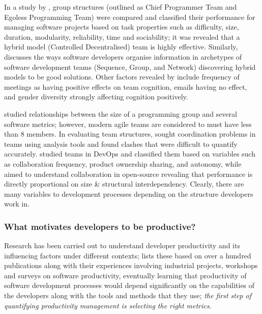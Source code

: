 \documentclass[../mpaper.tex]{subfiles}
\begin{document}
In a study by \citet{manteiEffectProgrammingTeam1981}, group structures (outlined as Chief Programmer Team and Egoless Programming Team) were compared and classified their performance for managing software projects based on task properties such as difficulty, size, duration, modularity, reliability, time and sociability; it was revealed that a hybrid model (Controlled Decentralised) team is highly effective. Similarly, \citet{sawyerSoftwareDevelopmentTeams2004} discusses the ways software developers organise information in archetypes of software development teams (Sequence, Group, and Network) discovering hybrid models to be good solutions. Other factors revealed by \citet{heTeamCognitionDevelopment2007} include frequency of meetings as having positive effects on team cognition, emails having no effect, and gender diversity strongly affecting cognition positively.

\citet{basili1979investigation} studied relationships between the size of a programming group and several software metrics; however, modern agile teams are considered to must have less than 8 members. In evaluating team structures, \citet{amritIdentifyingCoordinationProblems2012} sought coordination problems in teams using analysis tools and found clashes that were difficult to quantify accurately. \citet{lopez-fernandezDevOpsTeamStructures2022} studied teams in DevOps and classified them based on variables such as collaboration frequency, product ownership sharing, and autonomy, while \citet{nanJointEffectTeam2013} aimed to understand collaboration in open-source revealing that performance is directly proportional on size \& structural interdependency. Clearly, there are many variables to development processes depending on the structure developers work in.

\subsubsection*{What motivates developers to be productive?}

Research has been carried out to understand developer productivity and its influencing factors under different contexts; \citet{trendowiczChapterFactorsInfluencing2009} lists these based on over a hundred publications along with their experiences involving industrial projects, workshops and surveys on software productivity, eventually learning that productivity of software development processes would depend significantly on the capabilities of the developers along with the tools and methods that they use; \textit{the first step of quantifying productivity management is selecting the right metrics}.
\end{document}
